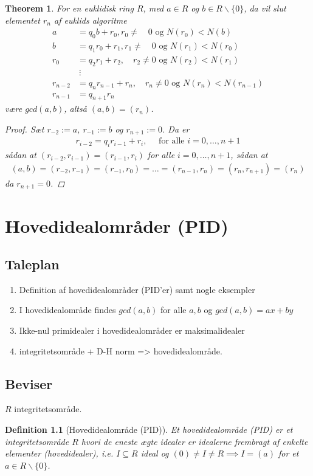\documentclass[10pt,twoside,openany,final]{memoir}
\theoremstyle{break}
\newtheorem{theorem}[section]{Theorem}
\newtheorem{definition}[section]{Definition}
\theoremstyle{Break}
\begin{document}
\begin{theorem}
For en euklidisk ring $R$, med $a \in R$ og $b \in R\backslash\{0\}$, da vil slut elementet $r_{n}$ af euklids algoritme 
\begin{align*}
a&=q_0 b + r_0,  r_0 \neq \quad 0 \text{ og } N(r_0) < N(b) \tag{0}\\ 
b&=q_1 r_0 + r_1,  r_1 \neq \quad 0 \text{ og } N(r_1) < N(r_0)\tag{1}\\
r_0&=q_2 r_1 + r_2, \quad r_2 \neq 0 \text{ og } N(r_2) < N(r_1)\tag{2}\\
&\ \vdots\\
r_{n-2}&=q_n r_{n-1} + r_n, \quad r_n \neq 0 \text{ og } N(r_n) < N(r_{n-1}) \tag{n}\\
r_{n-1}&=q_{n+1}r_n \tag{n+1}
\end{align*}
være $gcd(a,b)$, altså $(a,b)=(r_n)$.
\begin{proof}
Sæt $r_{-2}:=a$, $r_{-1}:=b$ og $r_{n+1}:=0$. Da er
\begin{align*}
r_{i-2}=q_ir_{i-1} + r_i, \quad \text{ for alle } i = 0,\dots,n+1
\end{align*}
sådan at $(r_{i-2},r_{i-1})=(r_{i-1},r_i)$ for alle $i=0,\dots,n+1$, sådan at
\begin{align*}
(a,b)=(r_{-2},r_{-1})=(r_{-1},r_0)=\dots=(r_{n-1},r_n)=(r_n,r_{n+1})=(r_n)
\end{align*}
da $r_{n+1}=0$.
\end{proof}
\end{theorem}

\chapter{Hovedidealområder (PID)}
\section*{Taleplan}
\begin{enumerate}
\item Definition af hovedidealområder (PID'er) samt nogle eksempler
\item I hovedidealområde findes $gcd(a,b)$ for alle $a,b$ og $gcd(a,b)=ax+by$
\item Ikke-nul primidealer i hovedidealområder er maksimalidealer
\item integritetsområde + D-H norm => hovedidealområde.
\end{enumerate}
\section*{Beviser}
$R$ integritetsområde.
\begin{definition}[Hovedidealområde (PID)]
Et hovedidealområde (PID) er et integritetsområde $R$ hvori de eneste ægte idealer er idealerne frembragt af enkelte elementer (hovedidealer), i.e. $I\subseteq R$ ideal og $(0)\neq I\neq R \implies I=(a)$ for et $a \in R\backslash\{0\}$. 
\end{definition}
\end{document}
